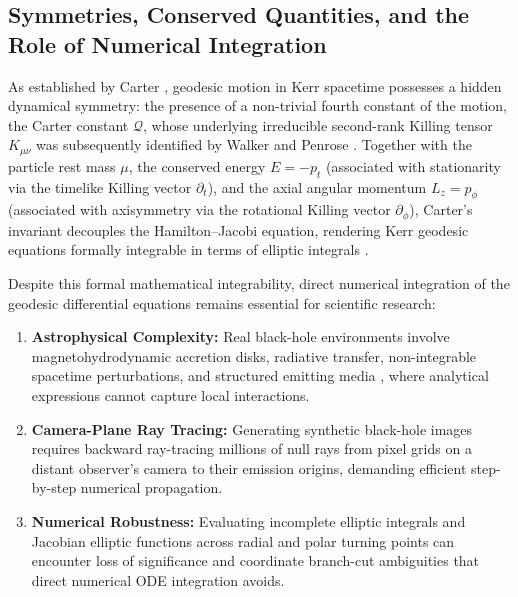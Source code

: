 \subsection{Symmetries, Conserved Quantities, and the Role of Numerical Integration}
As established by Carter \cite{Carter1968}, geodesic motion in Kerr spacetime possesses a hidden dynamical symmetry: the presence of a non-trivial fourth constant of the motion, the Carter constant $\mathcal{Q}$, whose underlying irreducible second-rank Killing tensor $K_{\mu\nu}$ was subsequently identified by Walker and Penrose \cite{WalkerPenrose1970}. Together with the particle rest mass $\mu$, the conserved energy $E = -p_t$ (associated with stationarity via the timelike Killing vector $\partial_t$), and the axial angular momentum $L_z = p_\phi$ (associated with axisymmetry via the rotational Killing vector $\partial_\phi$), Carter's invariant decouples the Hamilton--Jacobi equation, rendering Kerr geodesic equations formally integrable in terms of elliptic integrals \cite{Chandrasekhar1983,Bardeen1973}.

Despite this formal mathematical integrability, direct numerical integration of the geodesic differential equations remains essential for scientific research:
\begin{enumerate}[label=(\roman*)]
    \item \textbf{Astrophysical Complexity:} Real black-hole environments involve magnetohydrodynamic accretion disks, radiative transfer, non-integrable spacetime perturbations, and structured emitting media \cite{Falcke2000,Luminet1979,CunninghamBardeen1973,Chael2021}, where analytical expressions cannot capture local interactions.
    \item \textbf{Camera-Plane Ray Tracing:} Generating synthetic black-hole images requires backward ray-tracing millions of null rays from pixel grids on a distant observer's camera to their emission origins, demanding efficient step-by-step numerical propagation.
    \item \textbf{Numerical Robustness:} Evaluating incomplete elliptic integrals and Jacobian elliptic functions across radial and polar turning points can encounter loss of significance and coordinate branch-cut ambiguities that direct numerical ODE integration avoids.
\end{enumerate}

